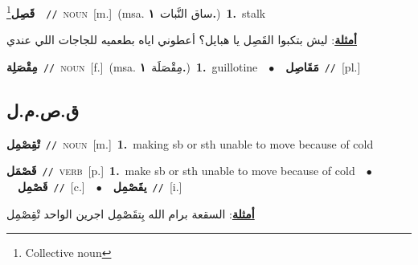 \documentclass[10pt,a4paper,twoside]{article} %
\begin{document}
\begin{multicols}{2}
{\setlength\topsep{0pt}\textbf{\foreignlanguage{arabic}{قَصِل}}\footnote{Collective noun}\ \ {\color{gray}\texttt{//}\color{black}}\ \textsc{noun}\ [m.]\ \color{gray}(msa. \foreignlanguage{arabic}{ساق النَّبات}~\foreignlanguage{arabic}{\textbf{١.}})\color{black}\ \textbf{1.}~stalk\  \begin{flushright}\color{gray}\foreignlanguage{arabic}{\textbf{\underline{\foreignlanguage{arabic}{أمثلة}}}: ليش بتكبوا القَصِل يا هبايل؟ أعطوني اياه بطعميه للجاجات اللي عندي}\end{flushright}\color{black}} \vspace{2mm}

{\setlength\topsep{0pt}\textbf{\foreignlanguage{arabic}{مِقْصَلِة}}\ {\color{gray}\texttt{//}\color{black}}\ \textsc{noun}\ [f.]\ \color{gray}(msa. \foreignlanguage{arabic}{مِقْصَلَة}~\foreignlanguage{arabic}{\textbf{١.}})\color{black}\ \textbf{1.}~guillotine\ \ $\bullet$\ \ \setlength\topsep{0pt}\textbf{\foreignlanguage{arabic}{مَقَاصِل}}\ {\color{gray}\texttt{//}\color{black}}\ [pl.]\ } \vspace{2mm}

\vspace{-3mm}
\subsection*{\color{blue}\foreignlanguage{arabic}{ق.ص.م.ل}\color{blue}{}} 

{\setlength\topsep{0pt}\textbf{\foreignlanguage{arabic}{تْقِصْمِل}}\ {\color{gray}\texttt{//}\color{black}}\ \textsc{noun}\ [m.]\ \textbf{1.}~making sb or sth unable to move because of cold\ } \vspace{2mm}

{\setlength\topsep{0pt}\textbf{\foreignlanguage{arabic}{قَصْمَل}}\ {\color{gray}\texttt{//}\color{black}}\ \textsc{verb}\ [p.]\ \textbf{1.}~make sb or sth unable to move because of cold\ \ $\bullet$\ \ \setlength\topsep{0pt}\textbf{\foreignlanguage{arabic}{قَصْمِل}}\ {\color{gray}\texttt{//}\color{black}}\ [c.]\ \ $\bullet$\ \ \setlength\topsep{0pt}\textbf{\foreignlanguage{arabic}{يقَصْمِل}}\ {\color{gray}\texttt{//}\color{black}}\ [i.]\  \begin{flushright}\color{gray}\foreignlanguage{arabic}{\textbf{\underline{\foreignlanguage{arabic}{أمثلة}}}: السقعة برام الله بِتقَصْمِل اجرين الواحد تْقِصْمِل}\end{flushright}\color{black}} \vspace{2mm}


\end{multicols}
\end{document}
